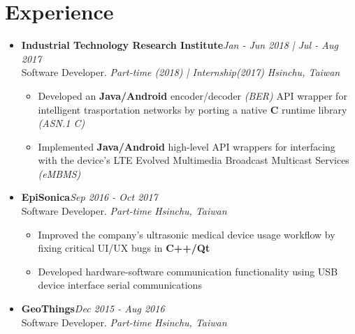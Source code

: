 \section{\sectionheading Experience}

\begin{itemize}[leftmargin=0pt, label={}]%

\item{
{\sectionheading\large{\textbf{Industrial Technology Research Institute}}}\hfill {\sectionheading\small{\textit{Jan - Jun 2018 | Jul - Aug 2017}}}\\
{\sectionheading\small{Software Developer. \textit{Part-time (2018) | Internship(2017)}}}\hfill
{\sectionheading\small{\textit{Hsinchu, Taiwan}}}

    \vspace{-6pt}
    \begin{itemize}[label=\textbullet, leftmargin=*, noitemsep]
        \item{Developed an \textbf{Java/Android} encoder/decoder \textit{(BER)} API wrapper for intelligent trasportation networks by porting a native \textbf{C} runtime library \textit{(ASN.1 C)}}
        \item{Implemented \textbf{Java/Android} high-level API wrappers for interfacing with the device's LTE Evolved Multimedia Broadcast Multicast Services \textit{(eMBMS)}}
    \end{itemize}
}

\item{
{\sectionheading\large{\textbf{EpiSonica}}}\hfill {\sectionheading\small{\textit{Sep 2016 - Oct 2017}}}\\
{\sectionheading\small{Software Developer. \textit{Part-time}}}\hfill
{\sectionheading\small{\textit{Hsinchu, Taiwan}}}

    \vspace{-6pt}
    \begin{itemize}[label=\textbullet, leftmargin=*, noitemsep]%
        \item{Improved the company's ultrasonic medical device usage workflow by fixing critical UI/UX bugs in \textbf{C++/Qt}}
        \item{Developed hardware-software communication functionality using USB device interface serial communications}
    \end{itemize}
}

\item{
{\sectionheading\large{\textbf{GeoThings}}}\hfill {\sectionheading\small{\textit{Dec 2015 - Aug 2016}}}\\
{\sectionheading\small{Software Developer. \textit{Part-time}}}\hfill
{\sectionheading\small{\textit{Hsinchu, Taiwan}}}

}
\end{itemize}

